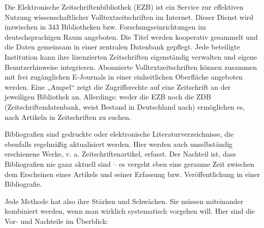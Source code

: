\documentclass[]{book}
\theoremstyle{definition}
\theoremstyle{definition}
\theoremstyle{definition}
\theoremstyle{remark}
\begin{document}
Die Elektronische Zeitschriftenbibliothek (EZB) ist ein Service zur
effektiven Nutzung wissenschaftlicher Volltextzeitschriften im Internet.
Dieser Dienst wird inzwischen in 343 Bibliotheken bzw.
Forschungseinrichtungen im deutschsprachigen Raum angeboten. Die Titel
werden kooperativ gesammelt und die Daten gemeinsam in einer zentralen
Datenbank gepflegt. Jede beteiligte Institution kann ihre lizenzierten
Zeitschriften eigenständig verwalten und eigene Benutzerhinweise
integrieren. Abonnierte Volltextzeitschriften können zusammen mit frei
zugänglichen E-Journals in einer einheitlichen Oberfläche angeboten
werden. Eine „Ampel`` zeigt die Zugriffsrechte auf eine Zeitschrift an
der jeweiligen Bibliothek an. Allerdings: weder die EZB noch die ZDB
(Zeitschriftendatenbank, weist Bestand in Deutschland nach) ermöglichen
es, nach Artikeln in Zeitschriften zu suchen.

Bibliografien sind gedruckte oder elektronische Literaturverzeichnisse,
die ebenfalls regelmäßig aktualisiert werden. Hier werden auch
unselbständig erschienene Werke, v. a. Zeitschriftenartikel, erfasst.
Der Nachteil ist, dass Bibliografien nie ganz aktuell sind -- es vergeht
eben eine geraume Zeit zwischen dem Erscheinen eines Artikels und seiner
Erfassung bzw. Veröffentlichung in einer Bibliografie.

Jede Methode hat also ihre Stärken und Schwächen. Sie müssen miteinander
kombiniert werden, wenn man wirklich systematisch vorgehen will. Hier
sind die Vor- und Nachteile im Überblick:
\end{document}
